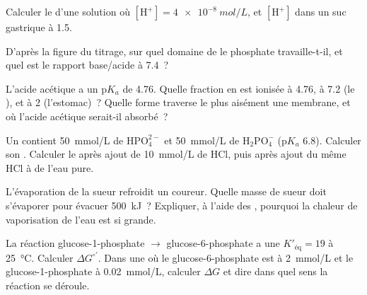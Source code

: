 \begin{exercise}[$\star$]\label{exo:b1:water-small-molecules:3}
Calculer le  d'une solution où $[\mathrm{H^+}] = \qty{4e-8}{mol/L}$,
et $[\mathrm{H^+}]$ dans un suc gastrique à  1.5.
\end{exercise}

\begin{exercise}[$\star$]\label{exo:b1:water-small-molecules:4}
D'après la figure du titrage, sur quel domaine de  le 
phosphate travaille-t-il, et quel est le rapport base/acide à  7.4~?
\end{exercise}

\begin{exercise}[$\star\star$]\label{exo:b1:water-small-molecules:5}
L'acide acétique a un p$K_a$ de 4.76. Quelle fraction en est ionisée à
 4.76, à  7.2 (le ), et à  2 (l'estomac)~? Quelle forme
traverse le plus aisément une membrane, et où l'acide acétique
serait-il absorbé~?
\end{exercise}

\begin{exercise}[$\star\star$]\label{exo:b1:water-small-molecules:6}
Un  contient \qty{50}{mmol/L} de $\mathrm{HPO_4^{2-}}$ et
\qty{50}{mmol/L} de $\mathrm{H_2PO_4^-}$ (p$K_a$ 6.8). Calculer son .
Calculer le  après ajout de \qty{10}{mmol/L} de HCl, puis après ajout
du même HCl à de l'eau pure.
\end{exercise}

\begin{exercise}[$\star\star$]\label{exo:b1:water-small-molecules:7}
L'évaporation de la sueur refroidit un coureur. Quelle masse de sueur
doit s'évaporer pour évacuer \qty{500}{kJ}~? Expliquer, à l'aide des
, pourquoi la chaleur de vaporisation de l'eau est si
grande.
\end{exercise}

\begin{exercise}[$\star\star$]\label{exo:b1:water-small-molecules:8}
La réaction glucose-1-phosphate $\to$ glucose-6-phosphate a une
$K'_{\text{éq}} = 19$ à \qty{25}{\celsius}. Calculer
$\Delta G^{\circ\prime}$. Dans une  où le glucose-6-phosphate est
à \qty{2}{mmol/L} et le glucose-1-phosphate à \qty{0.02}{mmol/L},
calculer $\Delta G$ et dire dans quel sens la réaction se déroule.
\end{exercise}

